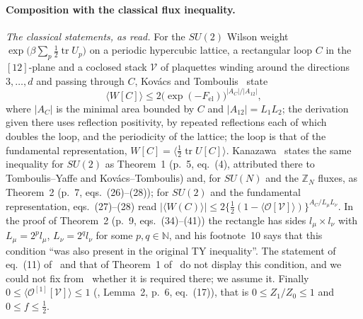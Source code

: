 \documentclass[11pt,a4paper]{article}
\theoremstyle{plain}
\theoremstyle{definition}
\theoremstyle{remark}
\numberwithin{equation}{section}
\begin{document}
\paragraph{Composition with the classical flux inequality.}
\emph{The classical statements, as read.} For the $SU(2)$ Wilson weight $\exp\bigl(\beta\sum_p\frac12\operatorname{tr}U_p\bigr)$ on a periodic hypercubic lattice, a rectangular loop $C$ in the $[12]$-plane and a coclosed stack $\mathcal V$ of plaquettes winding around the directions $3,\dots,d$ and passing through $C$, Kov\'acs and Tomboulis~\cite[eq.~(11), p.~5]{KT02} state
\[
\langle W[C]\rangle\le2\bigl(\exp(-F_{\mathrm{el}})\bigr)^{|A_C|/|A_{12}|},
\]
where $|A_C|$ is the minimal area bounded by $C$ and $|A_{12}|=L_1L_2$; the derivation given there uses reflection positivity, by repeated reflections each of which doubles the loop, and the periodicity of the lattice; the loop is that of the fundamental representation, $W[C]=\langle\frac12\operatorname{tr}U[C]\rangle$. Kanazawa~\cite{Kan} states the same inequality for $SU(2)$ as Theorem~1 (p.~5, eq.~(4), attributed there to Tomboulis--Yaffe and Kov\'acs--Tomboulis) and, for $SU(N)$ and the $\mathbb Z_N$ fluxes, as Theorem~2 (p.~7, eqs.~(26)--(28)); for $SU(2)$ and the fundamental representation, eqs.~(27)--(28) read $|\langle W(C)\rangle|\le2\{\frac12(1-\langle\mathcal O[\mathcal V]\rangle)\}^{A_C/L_\mu L_\nu}$. In the proof of Theorem~2 (p.~9, eqs.~(34)--(41)) the rectangle has sides $l_\mu\times l_\nu$ with $L_\mu=2^pl_\mu$, $L_\nu=2^ql_\nu$ for some $p,q\in\mathbb N$, and his footnote~10 says that this condition ``was also present in the original TY inequality''. The statement of eq.~(11) of~\cite{KT02} and that of Theorem~1 of~\cite{Kan} do not display this condition, and we could not fix from~\cite{KT02} whether it is required there; we assume it. Finally $0\le\langle\mathcal O^{[1]}[\mathcal V]\rangle\le1$ (\cite{Kan}, Lemma~2, p.~6, eq.~(17)), that is $0\le Z_1/Z_0\le1$ and $0\le f\le\frac12$.
\end{document}
